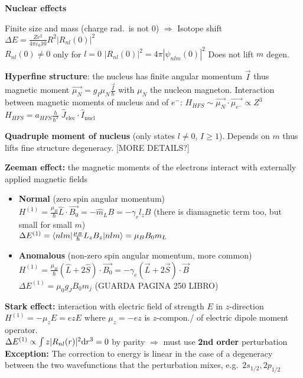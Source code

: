 \squishline

\textbf{Nuclear effects}
\begin{squishlist}
    \item Finite size and mass (charge rad.\ is not 0) $\Rightarrow$
    Isotope shift $\Delta E = \frac{Ze^2}{4 \pi \varepsilon_0 10}R^2 |R_{nl}(0)|^2$ \\ $R_{nl}(0) \neq 0$ only for $l=0$ \quad $|R_{nl}(0)|^2 = 4\pi |\psi_{nlm}(0)|^2$ \quad Does not lift $m$ degen.\
    \item \textbf{Hyperfine structure}: the nucleus has finite angular momentum $\vec{I}$ thus magnetic moment $\vec{\mu_N} = g_I \mu_N \frac{\vec{I}}{\hbar}$ with $\mu_N$ the nucleon magneton.
    Interaction between magnetic moments of nucleus and of $e^-$:
    $H_{HFS} \sim \vec{\mu_N}\cdot \vec{\mu_{e^-}} \propto Z^3$ \\
    $H_{HFS} = a_{HFS} \frac{h}{\hbar^2} \; \hat{J}_{\text{elec}}\cdot \hat{I}_{\text{nucl}}$
    \item \textbf{Quadruple moment of nucleus} (only states $l \neq 0$, $I \geq 1$). Depends on $m$ thus lifts fine structure degeneracy. [MORE DETAILS?]
\end{squishlist}

\begin{squishlist}
    \item \textbf{Zeeman effect:} the magnetic moments of the electrons interact with externally applied magnetic fields
    \begin{itemize}
        \item \textbf{Normal} (zero spin angular momentum) \\
        $H^{(1)} = \frac{\mu_B}{\hbar} \hat{L}\cdot \vec{B_0} = - \hat{m}_L B = -\gamma_e l_z B$ (there is diamagnetic term too, but small for small $m$) \\
        $\Delta E^{(1)} = \braket{nlm| \frac{\mu_B}{\hbar} L_z B_z |nlm} = \mu_B B_0 m_L$
        \item \textbf{Anomalous} (non-zero spin angular momentum, more common) \\
        $H^{(1)} = \frac{\mu_B}{\hbar}(\hat{L} + 2 \hat{S}) \cdot \vec{B_0}= -\gamma_e (\vec{L} + 2\vec{S}) \cdot \vec{B}$ \\
        $\Delta E^{(1)} = \mu_0 g_J B_0 m_j$ (GUARDA PAGINA 250 LIBRO)
    \end{itemize}

    \item \textbf{Stark effect:} interaction with electric field of strength $E$ in $z$-direction \\
    $H^{(1)} = - \mu_z E = e z E$ where $\mu_z = -e z$ is $z$-compon./ of electric dipole moment operator. \\
    $\Delta E^{(1)} \propto \int z |R_{nl}(r)|^2 \textrm{d} r^3 = 0$ by parity $\Longrightarrow$ must use \textbf{2nd order} perturbation \\
    \textbf{Exception:} The correction to energy is linear in the case of a degeneracy between the two wavefunctions that the perturbation mixes, e.g.\ $2s_{1/2}, 2p_{1/2}$
\end{squishlist}


